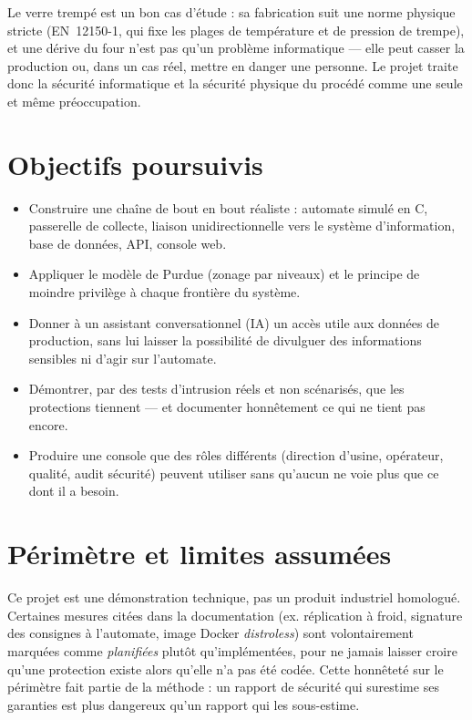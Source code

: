 \documentclass[11pt,a4paper]{report}
\begin{document}
Le verre trempé est un bon cas d'étude : sa fabrication suit une norme physique
stricte (EN~12150-1, qui fixe les plages de température et de pression de
trempe), et une dérive du four n'est pas qu'un problème informatique — elle peut
casser la production ou, dans un cas réel, mettre en danger une personne. Le
projet traite donc la sécurité informatique et la sécurité physique du procédé
comme une seule et même préoccupation.

\section{Objectifs poursuivis}
\begin{itemize}
  \item Construire une chaîne de bout en bout réaliste : automate simulé en C,
    passerelle de collecte, liaison unidirectionnelle vers le système
    d'information, base de données, API, console web.
  \item Appliquer le modèle de Purdue (zonage par niveaux) et le principe de
    moindre privilège à chaque frontière du système.
  \item Donner à un assistant conversationnel (IA) un accès utile aux données de
    production, sans lui laisser la possibilité de divulguer des informations
    sensibles ni d'agir sur l'automate.
  \item Démontrer, par des tests d'intrusion réels et non scénarisés, que les
    protections tiennent — et documenter honnêtement ce qui ne tient pas encore.
  \item Produire une console que des rôles différents (direction d'usine,
    opérateur, qualité, audit sécurité) peuvent utiliser sans qu'aucun ne voie
    plus que ce dont il a besoin.
\end{itemize}

\section{Périmètre et limites assumées}
Ce projet est une démonstration technique, pas un produit industriel homologué.
Certaines mesures citées dans la documentation (ex. réplication à froid,
signature des consignes à l'automate, image Docker \emph{distroless}) sont
volontairement marquées comme \emph{planifiées} plutôt qu'implémentées, pour ne
jamais laisser croire qu'une protection existe alors qu'elle n'a pas été codée.
Cette honnêteté sur le périmètre fait partie de la méthode : un rapport de
sécurité qui surestime ses garanties est plus dangereux qu'un rapport qui les
sous-estime.
\end{document}
